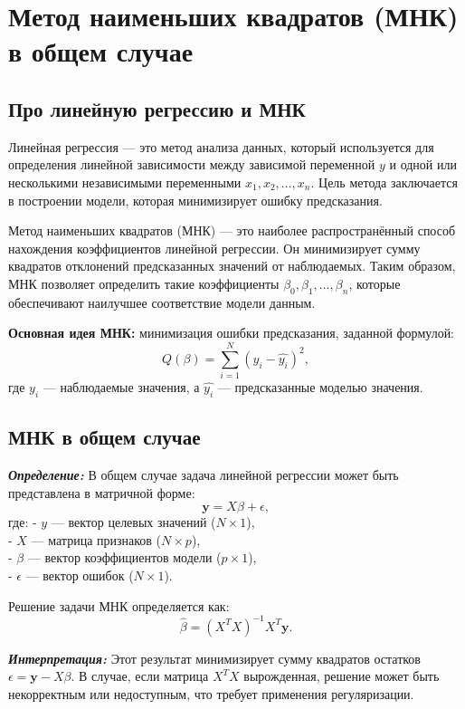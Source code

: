 \newpage

\section{Метод наименьших квадратов (МНК) в общем случае}

\subsection{Про линейную регрессию и МНК}

Линейная регрессия — это метод анализа данных, который используется для определения линейной зависимости между зависимой переменной \(y\) и одной или несколькими независимыми переменными \(x_1, x_2, \dots, x_n\). Цель метода заключается в построении модели, которая минимизирует ошибку предсказания.  

Метод наименьших квадратов (МНК) — это наиболее распространённый способ нахождения коэффициентов линейной регрессии. Он минимизирует сумму квадратов отклонений предсказанных значений от наблюдаемых. Таким образом, МНК позволяет определить такие коэффициенты \( \beta_0, \beta_1, \dots, \beta_n \), которые обеспечивают наилучшее соответствие модели данным.  

\textbf{Основная идея МНК:} минимизация ошибки предсказания, заданной формулой:
\[
Q(\beta) = \sum_{i=1}^{N} (y_i - \hat{y_i})^2,
\]
где \(y_i\) — наблюдаемые значения, а \( \hat{y_i} \) — предсказанные моделью значения.

\subsection{МНК в общем случае}

\textbf{\textit{Определение:}}  
В общем случае задача линейной регрессии может быть представлена в матричной форме:
\[
\mathbf{y} = X \beta + \epsilon,
\]
где:  
- \(y\) — вектор целевых значений (\(N \times 1\)), \\
- \(X\) — матрица признаков (\(N \times p\)), \\
- \(\beta\) — вектор коэффициентов модели (\(p \times 1\)), \\
- \(\epsilon\) — вектор ошибок (\(N \times 1\)).  

Решение задачи МНК определяется как:
\[
\hat{\beta} = (X^T X)^{-1} X^T \mathbf{y}.
\]

\textbf{\textit{Интерпретация:}}  
Этот результат минимизирует сумму квадратов остатков \(\epsilon = \mathbf{y} - X\beta\). В случае, если матрица \(X^T X\) вырожденная, решение может быть некорректным или недоступным, что требует применения регуляризации.

